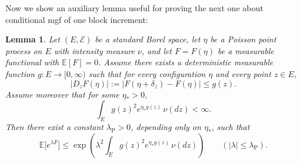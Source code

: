 \documentclass{article}
\newtheorem{lemma}{Lemma}[section]
\newcommand{\E}{\mathbb{E}}
\begin{document}
Now we show an auxiliary lemma useful for proving the next one about conditional mgf of one block increment: 
\begin{lemma}
\label{lem:poisson-bd-external}
Let $(E,\mathcal E)$ be a standard Borel space, let $\eta$ be a Poisson point process on $E$ with intensity measure $\nu$, and let $F=F(\eta)$ be a measurable functional with $\E[F]=0$. Assume there exists a deterministic measurable function $g:E\to[0,\infty)$ such that for every configuration $\eta$ and every point $z\in E$,
\[
|D_zF(\eta)|:=|F(\eta+\delta_z)-F(\eta)|\le g(z).
\]
Assume moreover that for some $\eta_*>0$,
\[
\int_E g(z)^2 e^{\eta_* g(z)}\,\nu(dz)<\infty.
\]
Then there exist a constant $\lambda_\mathrm{P}>0$, depending only on $\eta_*$, such that
\begin{equation}
\label{eq:poisson-bd-external-main}
\E\big[e^{\lambda F}\big]\le \exp\!\left(\lambda^2 \int_E g(z)^2 e^{\eta_* g(z)}\,\nu(dz)\right)
\qquad (|\lambda|\le \lambda_\mathrm{P}).
\end{equation}
\end{lemma}
\end{document}
